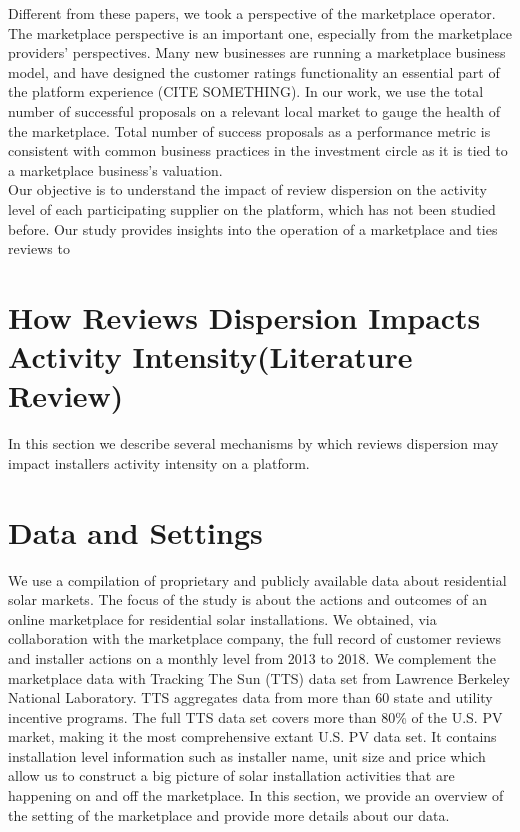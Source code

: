 \documentclass[msom,blindrev]{informs3}
\begin{document}
Different from these papers, we took a perspective of the marketplace operator. The marketplace perspective is an important one, especially from the marketplace providers' perspectives. Many new businesses are running a marketplace business model, and have designed the customer ratings functionality an essential part of the platform experience (CITE SOMETHING). In our work, we use the total number of successful proposals on a relevant local market to gauge the health of the marketplace. Total number of success proposals as a performance metric is consistent with common business practices in the investment circle \citep{boris_2018,galston_2017} as it is tied to a marketplace business's valuation. \\  

Our objective is to understand the impact of review dispersion on the activity level of each participating supplier on the platform, which has not been studied before. Our study provides insights into the operation of a marketplace and ties reviews to 



\section{How Reviews Dispersion Impacts Activity Intensity(Literature Review) }
 In this section we describe several mechanisms by which reviews dispersion may impact installers activity intensity on a platform. 
 
\section{Data and Settings}
We use a compilation of proprietary and publicly available data about residential solar markets. The focus of the study is about the actions and outcomes of an online marketplace for residential solar installations. We obtained, via collaboration with the marketplace company, the full record of customer reviews and installer actions on a monthly level from 2013 to 2018. We complement the marketplace data with Tracking The Sun (TTS) data set from Lawrence Berkeley National Laboratory. TTS aggregates data from more than 60 state and utility incentive programs. The full TTS data set covers more than 80\% of the U.S. PV
market, making it the most comprehensive extant U.S. PV data set. It contains installation level information such as installer name, unit size and price which allow us to construct a big picture of solar installation activities that are happening on and off the marketplace. In this section, we provide an overview of the setting of the marketplace and provide more details about our data.  
\end{document}
